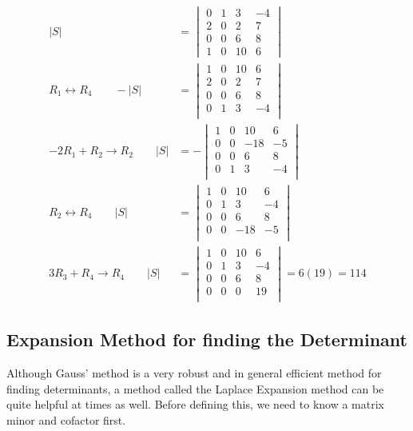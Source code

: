 \begin{example}
\begin{align*}
|S| & = \begin{vmatrix}
0 & 1 & 3  & -4 \\
2 & 0 & 2 & 7 \\
0 & 0 & 6 & 8 \\
1 & 0 & 10 & 6
\end{vmatrix} \\
R_1 \leftrightarrow R_4 \qquad  -|S| & =
\begin{vmatrix}
1 & 0 & 10 & 6 \\
2 & 0 & 2 & 7 \\
0 & 0 & 6 & 8 \\
0 & 1 & 3  & -4 \\
\end{vmatrix} \\
-2R_1 + R_2 \rightarrow R_2 \qquad |S| &=
- \begin{vmatrix}
1 & 0 & 10 & 6 \\
0 & 0 & -18 & -5 \\
0 & 0 & 6 & 8 \\
0 & 1 & 3  & -4 \\
\end{vmatrix} \\
R_2 \leftrightarrow R_4 \qquad |S| &=
\begin{vmatrix}
1 & 0 & 10 & 6 \\
0 & 1 & 3  & -4 \\
0 & 0 & 6 & 8 \\
0 & 0 & -18 & -5 \\
\end{vmatrix} \\
3 R_3 + R_4 \rightarrow R_4 \qquad |S| & =
\begin{vmatrix}
1 & 0 & 10 & 6 \\
0 & 1 & 3  & -4 \\
0 & 0 & 6 & 8 \\
0 & 0 & 0 & 19 \\
\end{vmatrix} = 6 (19) = 114
\end{align*}

\end{example}

\subsection{Expansion Method for finding the Determinant}

Although Gauss' method is a very robust and in general efficient method for finding determinants, a method called the Laplace Expansion method can be quite helpful at times as well.  Before defining this, we need to know a matrix minor and cofactor first.

